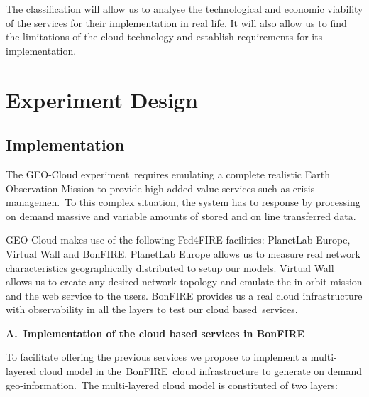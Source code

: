 \documentclass[a4paper]{article}
\begin{document}
\bigskip

The classification will allow us to analyse the technological and
economic viability of the services for their implementation in real
life. It will also allow us to find the limitations of the cloud
technology and establish requirements for its implementation.


\bigskip

\section[Experiment Design]{Experiment Design}
\hypertarget{Toc378868687}{}
\bigskip

\subsection[Implementation]{Implementation}
\hypertarget{Toc378868688}{}The GEO-Cloud experiment\ requires emulating
a complete realistic Earth Observation Mission to provide high added
value services such as crisis managemen.\ To this complex situation,
the system has to response by processing on demand massive and variable
amounts of stored and on line transferred data.


\bigskip

GEO-Cloud makes use of the following Fed4FIRE facilities: PlanetLab
Europe, Virtual Wall and BonFIRE. PlanetLab Europe allows us to measure
real network characteristics geographically distributed to setup our
models. Virtual Wall allows us to create any desired network topology
and emulate the in-orbit mission and the web service to the users.
BonFIRE provides us a real cloud infrastructure with observability in
all the layers to test our cloud based\ services.


\bigskip

\textbf{A.\ }\textbf{Implementation of the c}\textbf{loud based
service}\textbf{s in BonFIRE}\ 

To facilitate offering the previous services we propose to implement a
multi-layered cloud model in the\ BonFIRE\ cloud infrastructure to
generate on demand geo-information.\ The multi-layered cloud model is
constituted of two layers:


\bigskip
\end{document}
